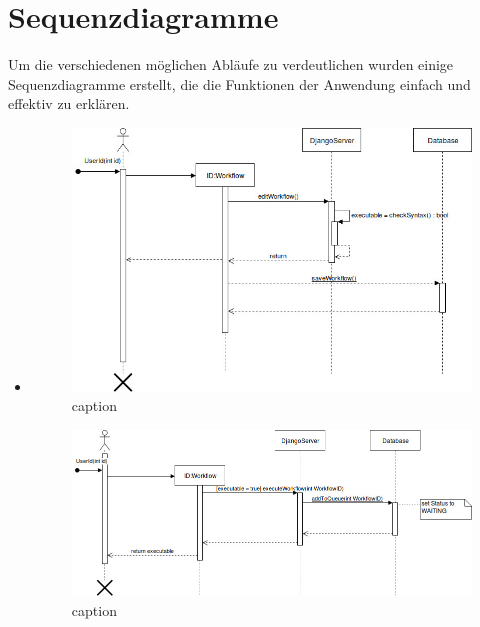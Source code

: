 \chapter{Sequenzdiagramme}
Um die verschiedenen möglichen Abläufe zu verdeutlichen wurden einige Sequenzdiagramme erstellt, die die Funktionen der Anwendung einfach und effektiv zu erklären.


\begin{itemize}

    \item 
    
    \begin{figure}[h]
      \centering
      \includegraphics[width=15cm]{images/sqd_edit_workflow.jpg}
      \caption{caption}
      \label{fig:sqd_edit}
    \end{figure}
    
    \begin{figure}[h]
      \centering
      \includegraphics[width=15cm]{images/sqd_execute_workflow_client.jpg}
      \caption{caption}
      \label{fig:sqd_exec_client}
    \end{figure}
    

\end{itemize}
